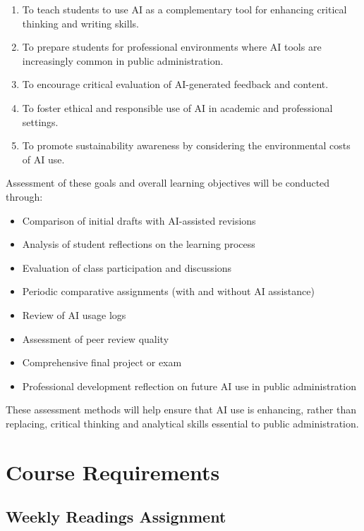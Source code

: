 \documentclass[11pt, letterpaper]{article}
\begin{document}
\begin{enumerate}
    \item To teach students to use AI as a complementary tool for enhancing critical thinking and writing skills.
    \item To prepare students for professional environments where AI tools are increasingly common in public administration.
    \item To encourage critical evaluation of AI-generated feedback and content.
    \item To foster ethical and responsible use of AI in academic and professional settings.
    \item To promote sustainability awareness by considering the environmental costs of AI use.
\end{enumerate}

\noindent Assessment of these goals and overall learning objectives will be conducted through:

\begin{itemize}
    \item Comparison of initial drafts with AI-assisted revisions
    \item Analysis of student reflections on the learning process
    \item Evaluation of class participation and discussions
    \item Periodic comparative assignments (with and without AI assistance)
    \item Review of AI usage logs
    \item Assessment of peer review quality
    \item Comprehensive final project or exam
    \item Professional development reflection on future AI use in public administration
\end{itemize}

\noindent These assessment methods will help ensure that AI use is enhancing, rather than replacing, critical thinking and analytical skills essential to public administration.

\section{Course Requirements}
\subsection*{Weekly Readings Assignment}
\end{document}
